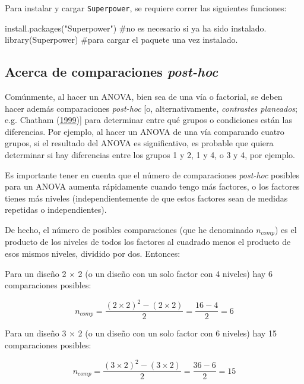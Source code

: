 \documentclass[
]{article}
\newenvironment{Shaded}{\begin{snugshade}}{\end{snugshade}}
\newcommand{\CommentTok}[1]{\textcolor[rgb]{0.48,0.49,0.49}{#1}}
\newcommand{\FunctionTok}[1]{\textcolor[rgb]{0.56,0.27,0.68}{#1}}
\newcommand{\NormalTok}[1]{\textcolor[rgb]{0.81,0.81,0.76}{#1}}
\newcommand{\StringTok}[1]{\textcolor[rgb]{0.96,0.31,0.31}{#1}}
\begin{document}
Para instalar y cargar \texttt{Superpower}, se requiere correr las
siguientes funciones:

\begin{Shaded}
\begin{Highlighting}[]
\FunctionTok{install.packages}\NormalTok{(}\StringTok{"Superpower"}\NormalTok{) }\CommentTok{\#no es necesario si ya ha sido instalado.}
\FunctionTok{library}\NormalTok{(Superpower) }\CommentTok{\#para cargar el paquete una vez instalado.}
\end{Highlighting}
\end{Shaded}

\hypertarget{multcomp}{%
\subsection{\texorpdfstring{Acerca de comparaciones
\emph{post-hoc}}{Acerca de comparaciones post-hoc}}\label{multcomp}}

Comúnmente, al hacer un ANOVA, bien sea de una vía o factorial, se deben
hacer además comparaciones \emph{post-hoc} {[}o, alternativamente,
\emph{contrastes planeados}; e.g. Chatham
(\protect\hyperlink{ref-chathamPlannedContrastsOverview1999}{1999}){]}
para determinar entre qué grupos o condiciones están las diferencias.
Por ejemplo, al hacer un ANOVA de una vía comparando cuatro grupos, si
el resultado del ANOVA es significativo, es probable que quiera
determinar si hay diferencias entre los grupos 1 y 2, 1 y 4, o 3 y 4,
por ejemplo.

Es importante tener en cuenta que el número de comparaciones
\emph{post-hoc} posibles para un ANOVA aumenta rápidamente cuando tengo
más factores, o los factores tienes más niveles (independientemente de
que estos factores sean de medidas repetidas o independientes).

De hecho, el número de posibles comparaciones (que he denominado
\(n_{comp}\)) es el producto de los niveles de todos los factores al
cuadrado menos el producto de esos mismos niveles, dividido por dos.
Entonces:

Para un diseño 2 \(\times\) 2 (o un diseño con un solo factor con 4
niveles) hay 6 comparaciones posibles:

\[n_{comp} = \frac{(2 \times 2)^2-(2 \times 2)}{2} = \frac{16-4}{2} = 6\]

Para un diseño 3 \(\times\) 2 (o un diseño con un solo factor con 6
niveles) hay 15 comparaciones posibles:

\[n_{comp} = \frac{(3 \times 2)^2-(3 \times 2)}{2} = \frac{36-6}{2} = 15\]
\end{document}
